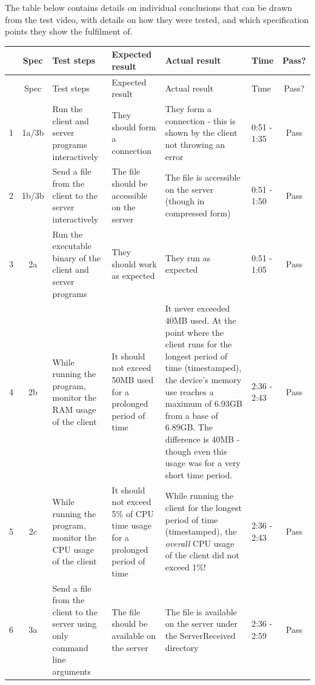 \documentclass[../main.tex]{subfiles}
\begin{document}
The table below contains details on individual conclusions that can be drawn from the test video, with details on how they were tested, and which specification points they show the fulfilment of.

\begin{longtable}{|c|c|p{3.1cm}|p{3.1cm}|p{3.4cm}|p{0.9cm}|c|}
\hline
& Spec & Test steps & Expected result & Actual result & Time & Pass? \\
\hline
\endfirsthead

\hline
& Spec & Test steps & Expected result & Actual result & Time & Pass? \\
\hline
\endhead

\hline
\endfoot

\hline
\endlastfoot

1 & 1a/3b & Run the client and server programs interactively & They should form a connection & They form a connection - this is shown by the client not throwing an error & 0:51 - 1:35 & Pass \\
\hline
2 & 1b/3b & Send a file from the client to the server interactively & The file should be accessible on the server & The file is accessible on the server (though in compressed form) & 0:51 - 1:50 & Pass \\
\hline
3 & 2a & Run the executable binary of the client and server programs & They should work as expected & They run as expected & 0:51 - 1:05 & Pass \\
\hline
4 & 2b & While running the program, monitor the RAM usage of the client & It should not exceed 50MB used for a prolonged period of time & It never exceeded 40MB used. At the point where the client runs for the longest period of time (timestamped), the device's memory use reaches a maximum of 6.93GB from a base of 6.89GB. The difference is 40MB - though even this usage was for a very short time period. & 2:36 - 2:43 & Pass \\
\hline
5 & 2c & While running the program, monitor the CPU usage of the client & It should not exceed 5\% of CPU time usage for a prolonged period of time & While running the client for the longest period of time (timestamped), the \textit{overall} CPU usage of the client did not exceed 1\%! & 2:36 - 2:43 & Pass \\
\hline
6 & 3a & Send a file from the client to the server using only command line arguments & The file should be available on the server & The file is available on the server under the ServerReceived directory & 2:36 - 2:59 & Pass \\

\end{longtable}
\end{document}
